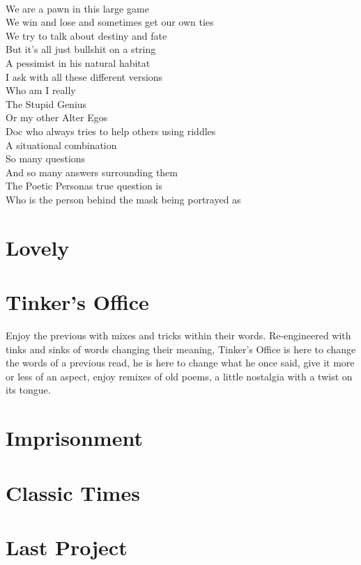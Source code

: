 \documentclass[12pt, b5paper, oneside]{book}
\begin{document}
\\We are a pawn in this large game
\\We win and lose and sometimes get our own ties
\\We try to talk about destiny and fate
\\But it's all just bullshit on a string
\\A pessimist in his natural habitat
\\I ask with all these different versions
\\Who am I really
\\The Stupid Genius
\\Or my other Alter Egos
\\Doc who always tries to help others using riddles
\\A situational combination
\\So many questions
\\And so many answers surrounding them
\\The Poetic Personas true question is
\\Who is the person behind the mask being portrayed as
\newpage








\chapter{Lovely}
\newpage
\chapter{Tinker's Office}
Enjoy the previous with mixes and tricks within their words. Re-engineered with tinks and sinks of words changing their meaning, 
Tinker's Office is here to change the words of a previous read, he is here to change what he once said, give it more or less of an 
aspect, enjoy remixes of old poems, a little nostalgia with a twist on its tongue. 
\newpage
\chapter{Imprisonment}
\newpage
\chapter{Classic Times}
\newpage
\chapter{Last Project}
\end{document}
